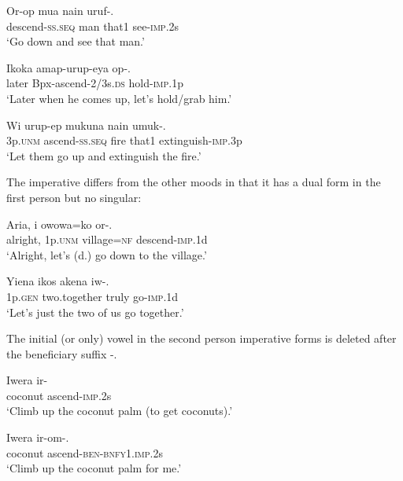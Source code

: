\ea%
\label{ex:3:x229}
\gll Or-op mua nain uruf-. \\
descend-\textsc{ss}.\textsc{seq} man that1 see-\textsc{imp}.2s \\
\glt`Go down and see that man.'
\z

\ea%
\label{ex:3:x1847}
\gll Ikoka amap-urup-eya op-. \\
later Bpx-ascend-2/3s.\textsc{ds} hold-\textsc{imp}.1p\\
\glt`Later when he comes up, let's hold/grab him.'
\z

\ea%
\label{ex:3:x230}
\gll Wi urup-ep mukuna nain umuk-. \\
3p.\textsc{unm} ascend-\textsc{ss}.\textsc{seq} fire that1 extinguish-\textsc{imp}.3p\\
\glt`Let them go up and extinguish the fire.' 
\z

The imperative differs from the other moods in that it has a dual form in the first person but no singular: 

\ea%
\label{ex:3:x446}
\gll Aria, i owowa=ko or-. \\
alright, 1p.\textsc{unm} village=\textsc{nf} descend-\textsc{imp}.1d\\
\glt`Alright, let's (d.) go down to the village.'
\z

\ea%
\label{ex:3:x1196}
\gll Yiena ikos akena iw-. \\
1p.\textsc{gen} two.together truly go-\textsc{imp}.1d\\
\glt`Let's just the two of us go together.'
\z

The initial (or only) vowel in the second person imperative forms is deleted after the beneficiary suffix -. 

\ea%
\label{ex:3:x432}
\gll Iwera ir- \\
coconut ascend-\textsc{imp}.2s\\
\glt`Climb up the coconut palm (to get coconuts).'
\z

\ea%
\label{ex:3:x431}
\gll Iwera ir-om-. \\
coconut ascend-\textsc{ben}-\textsc{bnfy}1.\textsc{imp}.2s\\
\glt`Climb up the coconut palm for me.'
\z

